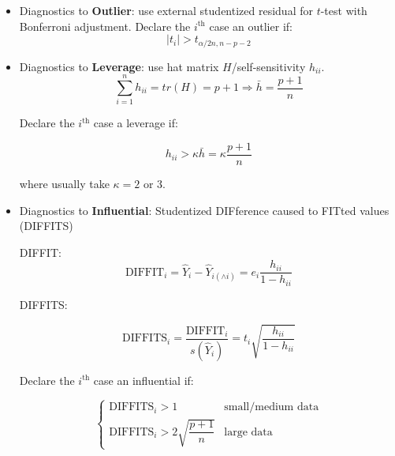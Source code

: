 \begin{itemize}[topsep=2pt,itemsep=0pt]
    \item Diagnostics to \textbf{Outlier}: use external studentized residual for $ t $-test with Bonferroni adjustment. Declare the $ i^\mathrm{th} $ case an outlier if: 
    \begin{equation}
         |t_i|>t_{\alpha/2n,n-p-2}
    \end{equation}
    \item {}Diagnostics to \textbf{Leverage}: use hat matrix $ H $/self-sensitivity $ h_{ii} $.
    \begin{equation}
        \sum_{i=1}^n h_{ii}=tr(H)=p+1 \Rightarrow \bar{h}=\dfrac{p+1}{n} 
    \end{equation}
    
    Declare the $ i^\mathrm{th}  $ case a {leverage} if:
    
    \begin{equation}
        h_{ii}>\kappa \bar{h}=\kappa \dfrac{p+1}{n} 
    \end{equation}
    
    where usually take $ \kappa =2 $ or $ 3 $.
    \item Diagnostics to \textbf{Influential}: Studentized DIFference caused to FITted values (DIFFITS)
    
    DIFFIT:
    \begin{equation}
        \mathrm{DIFFIT}_i=\hat{Y}_i-\hat{Y}_{i(\wedge i)}=e_i\dfrac{h_{ii}}{1-h_{ii}} 
    \end{equation}

    DIFFITS:
    
    \begin{equation}
        \mathrm{DIFFITS}_i=\dfrac{\mathrm{DIFFIT}_i}{s(\hat{Y}_i)}=t_i\sqrt{\dfrac{h_{ii}}{1-h_{ii}}}
    \end{equation}
    
    Declare the $ i^\mathrm{th}  $ case an {influential} if:
    
    \begin{equation}
        \begin{cases}
            \mathrm{DIFFITS}_i>1&\text{small/medium data} \\
            \mathrm{DIFFITS}_i>2\sqrt{\dfrac{p+1}{n}}&\text{large data}
        \end{cases}   
    \end{equation}
    

\end{itemize}
